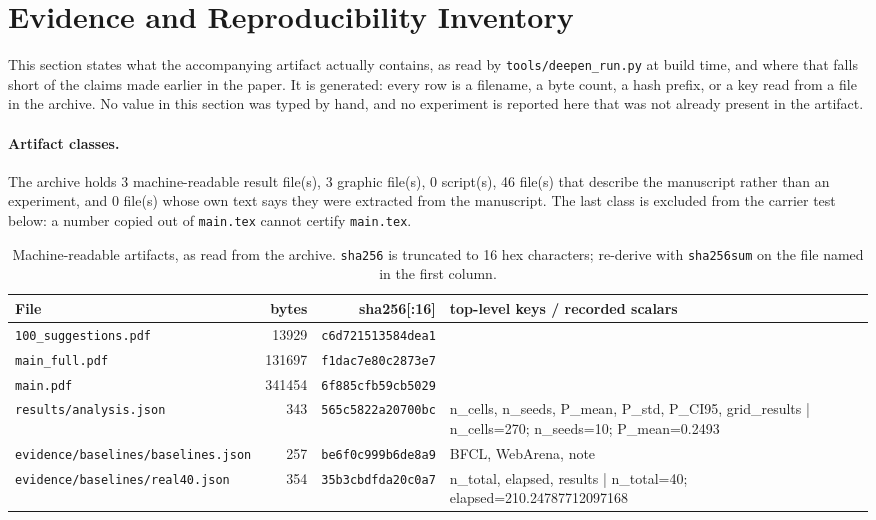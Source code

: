 \section{Evidence and Reproducibility Inventory}\label{sec:evidenceinventory}
This section states what the accompanying artifact actually contains, as read by \texttt{tools/deepen\_run.py} at build time, and where that falls short of the claims made earlier in the paper. It is generated: every row is a filename, a byte count, a hash prefix, or a key read from a file in the archive. No value in this section was typed by hand, and no experiment is reported here that was not already present in the artifact.

\paragraph{Artifact classes.} The archive holds 3 machine-readable result file(s), 3 graphic file(s), 0 script(s), 46 file(s) that describe the manuscript rather than an experiment, and 0 file(s) whose own text says they were extracted from the manuscript. The last class is excluded from the carrier test below: a number copied out of \texttt{main.tex} cannot certify \texttt{main.tex}.

\begin{table}[ht]\centering\small
\caption{Machine-readable artifacts, as read from the archive. \texttt{sha256} is truncated to 16 hex characters; re-derive with \texttt{sha256sum} on the file named in the first column.}
\label{tab:artifactinventory}
\begin{tabular}{p{5.6cm} rr p{5.2cm}}\toprule
File & bytes & sha256[:16] & top-level keys / recorded scalars \\\midrule
\texttt{100\_\hspace{0pt}suggestions.pdf} & 13929 & \texttt{c6d721513584dea1} & \footnotesize \\
\texttt{main\_\hspace{0pt}full.pdf} & 131697 & \texttt{f1dac7e80c2873e7} & \footnotesize \\
\texttt{main.pdf} & 341454 & \texttt{6f885cfb59cb5029} & \footnotesize \\
\texttt{results/\hspace{0pt}analysis.json} & 343 & \texttt{565c5822a20700bc} & \footnotesize n\_cells, n\_seeds, P\_mean, P\_std, P\_CI95, grid\_results | n\_cells=270; n\_seeds=10; P\_mean=0.2493\\
\texttt{evidence/\hspace{0pt}baselines/\hspace{0pt}baselines.json} & 257 & \texttt{be6f0c999b6de8a9} & \footnotesize BFCL, WebArena, note\\
\texttt{evidence/\hspace{0pt}baselines/\hspace{0pt}real40.json} & 354 & \texttt{35b3cbdfda20c0a7} & \footnotesize n\_total, elapsed, results | n\_total=40; elapsed=210.24787712097168\\
\bottomrule\end{tabular}\end{table}

